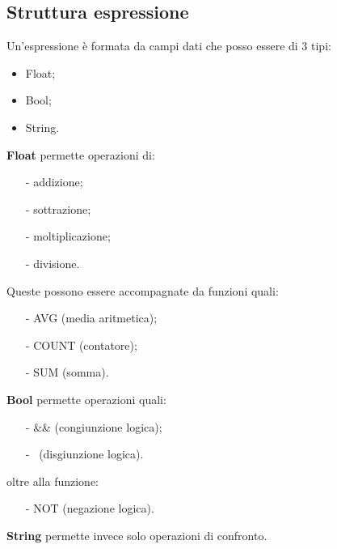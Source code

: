 \subsection{Struttura espressione}
Un'espressione \`e formata da campi dati che posso essere di 3 tipi:
\begin{itemize}
\item Float;
\item Bool;
\item String. 
\end{itemize}
\textbf{Float} permette operazioni di:
\begin{itemize}
\item[-] addizione;
\item[-] sottrazione;
\item[-] moltiplicazione;
\item[-] divisione.
\end{itemize}
Queste possono essere accompagnate da funzioni quali:
\begin{itemize}
\item[-] AVG (media aritmetica);
\item[-] COUNT (contatore);
\item[-] SUM (somma). 
\end{itemize}
\textbf{Bool} permette operazioni quali:
\begin{itemize}
\item[-] \&\& (congiunzione logica);
\item[-] \textbar\textbar\ (disgiunzione logica).
\end{itemize}
oltre alla funzione:
\begin{itemize}
\item[-] NOT (negazione logica). 
\end{itemize}
\textbf{String} permette invece solo operazioni di confronto.

